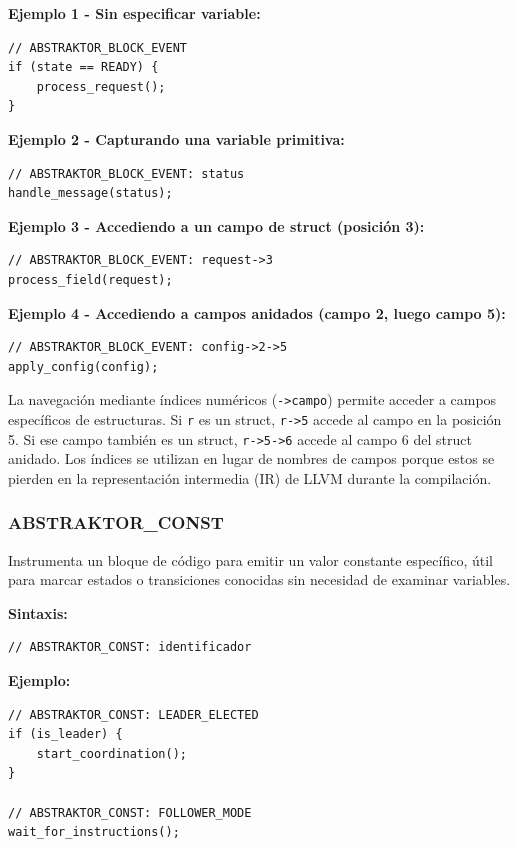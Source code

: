 \documentclass[12pt]{article}
\begin{document}
\textbf{Ejemplo 1 - Sin especificar variable:}

\begin{verbatim}
// ABSTRAKTOR_BLOCK_EVENT
if (state == READY) {
    process_request();
}
\end{verbatim}

\textbf{Ejemplo 2 - Capturando una variable primitiva:}

\begin{verbatim}
// ABSTRAKTOR_BLOCK_EVENT: status
handle_message(status);
\end{verbatim}

\textbf{Ejemplo 3 - Accediendo a un campo de struct (posición 3):}

\begin{verbatim}
// ABSTRAKTOR_BLOCK_EVENT: request->3
process_field(request);
\end{verbatim}

\textbf{Ejemplo 4 - Accediendo a campos anidados (campo 2, luego campo 5):}

\begin{verbatim}
// ABSTRAKTOR_BLOCK_EVENT: config->2->5
apply_config(config);
\end{verbatim}

La navegación mediante índices numéricos (\texttt{->campo}) permite acceder a campos específicos de estructuras. Si \texttt{r} es un struct, \texttt{r->5} accede al campo en la posición 5. Si ese campo también es un struct, \texttt{r->5->6} accede al campo 6 del struct anidado. Los índices se utilizan en lugar de nombres de campos porque estos se pierden en la representación intermedia (IR) de LLVM durante la compilación.

\subsubsection{ABSTRAKTOR\_CONST}

Instrumenta un bloque de código para emitir un valor constante específico, útil para marcar estados o transiciones conocidas sin necesidad de examinar variables.

\textbf{Sintaxis:}
\begin{verbatim}
// ABSTRAKTOR_CONST: identificador
\end{verbatim}

\textbf{Ejemplo:}

\begin{verbatim}
// ABSTRAKTOR_CONST: LEADER_ELECTED
if (is_leader) {
    start_coordination();
}

// ABSTRAKTOR_CONST: FOLLOWER_MODE
wait_for_instructions();
\end{verbatim}
\end{document}
